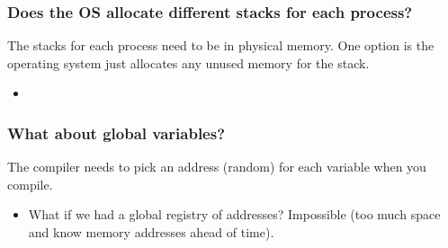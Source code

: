 \subsubsection{Does the OS allocate different stacks for each process?}
\begin{definition}
    The stacks for each process need to be in physical memory. One option is the operating system just allocates any unused memory for the stack. 
    \begin{itemize}
        \item 
    \end{itemize}
\end{definition}

\subsubsection{What about global variables?}
\begin{definition}
    The compiler needs to pick an address (random) for each variable when you compile.
    \begin{itemize}
        \item What if we had a global registry of addresses? Impossible (too much space and know memory addresses ahead of time).
    \end{itemize}
\end{definition}